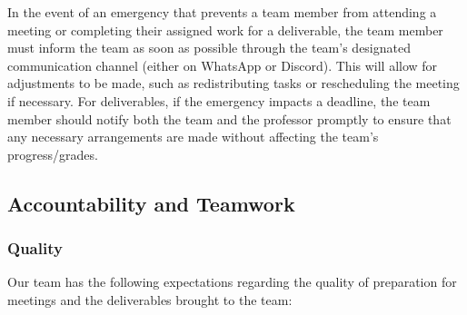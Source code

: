 \documentclass{article}
\begin{document}
In the event of an emergency that prevents a team member from
attending a meeting or completing
their assigned work for a deliverable, the team member must inform
the team as soon as possible
through the team's designated communication channel (either on
WhatsApp or Discord). This will
allow for adjustments to be made, such as redistributing tasks or
rescheduling the meeting if
necessary. For deliverables, if the emergency impacts a deadline, the
team member should notify
both the team and the professor promptly to ensure that any necessary
arrangements are made
without affecting the team's progress/grades.

\subsection*{Accountability and Teamwork}

\subsubsection*{\color{blue}Quality}

Our team has the following expectations regarding the quality of
preparation for meetings and the deliverables brought to the team:
\end{document}
